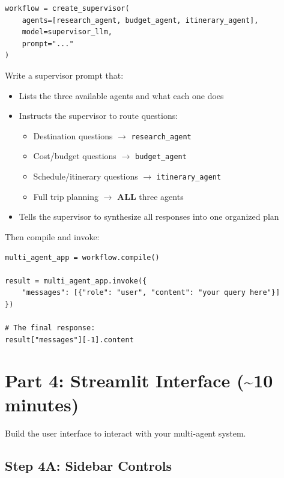 \documentclass[11pt, letterpaper]{article}
\begin{document}
\begin{lstlisting}
workflow = create_supervisor(
    agents=[research_agent, budget_agent, itinerary_agent],
    model=supervisor_llm,
    prompt="..."
)
\end{lstlisting}

\noindent Write a supervisor prompt that:
\begin{itemize}[nosep]
  \item Lists the three available agents and what each one does
  \item Instructs the supervisor to route questions:
    \begin{itemize}[nosep]
      \item Destination questions $\rightarrow$ \texttt{research\_agent}
      \item Cost/budget questions $\rightarrow$ \texttt{budget\_agent}
      \item Schedule/itinerary questions $\rightarrow$ \texttt{itinerary\_agent}
      \item Full trip planning $\rightarrow$ \textbf{ALL} three agents
    \end{itemize}
  \item Tells the supervisor to synthesize all responses into one organized plan
\end{itemize}

\noindent Then compile and invoke:

\begin{lstlisting}
multi_agent_app = workflow.compile()

result = multi_agent_app.invoke({
    "messages": [{"role": "user", "content": "your query here"}]
})

# The final response:
result["messages"][-1].content
\end{lstlisting}


\section{Part 4: Streamlit Interface \textnormal{(\textasciitilde10 minutes)}}

Build the user interface to interact with your multi-agent system.

\subsection*{Step 4A: Sidebar Controls}
\end{document}
